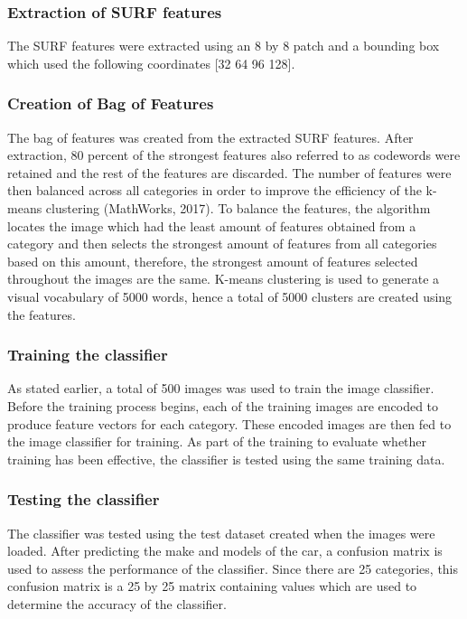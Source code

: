 \documentclass[a4paper, 12pt]{article}
\begin{document}
\subsubsection{Extraction of SURF features}
The SURF features were extracted using an 8 by 8 patch and a bounding box which used the following coordinates [32 64 96 128].

\subsubsection{Creation of Bag of Features}
The bag of features was created from the extracted SURF features. After extraction, 80 percent of the strongest features also referred to as codewords were retained and the rest of the features are discarded. The number of features were then balanced across all categories in order to improve the efficiency of the k-means clustering (MathWorks, 2017). To balance the features, the algorithm locates the image which had the least amount of features obtained from a category and then selects the strongest amount of features from all categories based on this amount, therefore, the strongest amount of features selected throughout the images are the same. K-means clustering is used to generate a visual vocabulary of 5000 words, hence a total of 5000 clusters are created using the features.

\subsubsection{Training the classifier}
As stated earlier, a total of 500 images was used to train the image classifier. Before the training process begins, each of the training images are encoded to produce feature vectors for each category. These encoded images are then fed to the image classifier for training. As part of the training to evaluate whether training has been effective, the classifier is tested using the same training data. 

\subsubsection{Testing the classifier}
The classifier was tested using the test dataset created when the images were loaded. After predicting the make and models of the car, a confusion matrix is used to assess the performance of the classifier. Since there are 25 categories, this confusion matrix is a 25 by 25 matrix containing values which are used to determine the accuracy of the classifier. 
\end{document}

